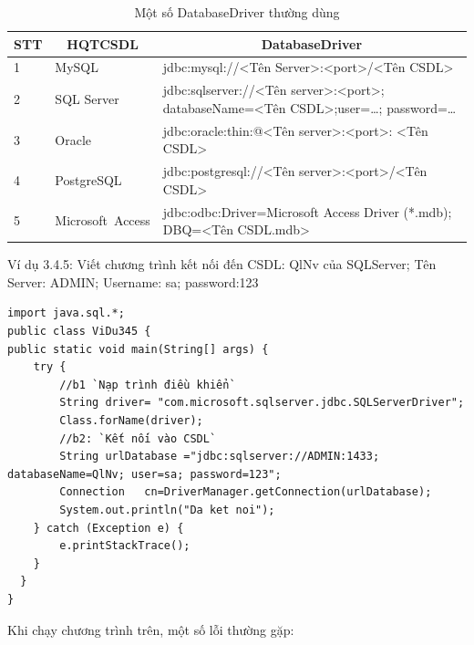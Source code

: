 \begin{center}
	\begin{longtable}{|m{1cm}|m{2cm}|m{8cm}|}
		\caption[Một số DatabaseURL thường dùng]{Một số DatabaseDriver thường dùng}
		\label{bang33}
		\endfirsthead
		\endhead
		\hline
		\multicolumn{1}{|c|}{\textbf{STT}} &\multicolumn{1}{c|}{	\textbf{ HQTCSDL}}
		&\multicolumn{1}{c|}{	\textbf{DatabaseDriver}}\\ \hline
		1&	MySQL & jdbc:mysql://<Tên Server>:<port>/<Tên CSDL>\\ \hline
		2&SQL Server &	jdbc:sqlserver://<Tên server>:<port>; databaseName=<Tên CSDL>;user=…; password=… 
		 \\ \hline
		3&	Oracle & jdbc:oracle:thin:@<Tên server>:<port>: <Tên CSDL>
		\\ \hline 
		4&	PostgreSQL &jdbc:postgresql://<Tên server>:<port>/<Tên CSDL>\\ \hline 
		5&	Microsoft Access
		&	jdbc:odbc:Driver={Microsoft Access Driver (*.mdb)};
		DBQ=<Tên CSDL.mdb>
		\\ \hline 
	\end{longtable}
\end{center}
\vspace{-1cm}
Ví dụ 3.4.5: Viết chương trình kết nối đến CSDL: QlNv của SQLServer; Tên Server: ADMIN; Username: sa; password:123
 \begin{lstlisting}[escapechar=`]
import java.sql.*;
public class ViDu345 {
public static void main(String[] args) {
	try {
		//b1 `Nạp trình điều khiển`
		String driver= "com.microsoft.sqlserver.jdbc.SQLServerDriver";
		Class.forName(driver);
		//b2: `Kết nối vào CSDL`
		String urlDatabase ="jdbc:sqlserver://ADMIN:1433; databaseName=QlNv; user=sa; password=123";
		Connection   cn=DriverManager.getConnection(urlDatabase);
		System.out.println("Da ket noi");
	} catch (Exception e) {
		e.printStackTrace();
	}
  }
}
 \end{lstlisting}
 Khi chạy chương trình trên, một số lỗi thường gặp:
 
